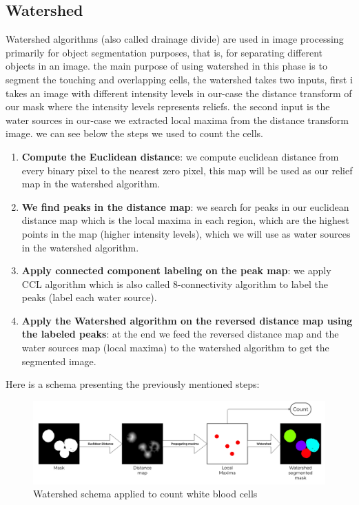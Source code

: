 \subsection{Watershed}
\hspace{\parindent}
Watershed algorithms (also called drainage divide) are used in image processing primarily for object segmentation purposes, that is, for separating different objects in an image. the main purpose of using watershed in this phase is to segment the touching and overlapping cells, the watershed takes two inputs, first i takes an image with different intensity levels in our-case the distance transform of our mask where the intensity levels represents reliefs. the second input is the water sources in our-case we extracted local maxima from the distance transform image. we can see below the steps we used to count the cells.

\begin{enumerate}
    \item \textbf{Compute the Euclidean distance}: we compute euclidean distance from every binary pixel to the nearest zero pixel, this map will be used as our relief map in the watershed algorithm.
    \item \textbf{We find peaks in the distance map}: we search for peaks in our euclidean distance map which is the local maxima in each region, which are the highest points in the map (higher intensity levels), which we will use as water sources in the watershed algorithm.
    \item \textbf{Apply connected component labeling on the peak map}: we apply CCL algorithm which is also called 8-connectivity algorithm to label the peaks (label each water source).
    \item \textbf{Apply the Watershed algorithm on the reversed distance map using the labeled peaks}: at the end we feed the reversed distance map and the water sources map (local maxima) to the watershed algorithm to get the segmented image. 
\end{enumerate}

Here is a schema presenting the previously mentioned steps:

\begin{figure}[H]
\centering
  \vspace{-0.1in}
    \centerline{\includegraphics[width = 7in]{../images/watershed.png}}
    \caption{Watershed schema applied to count white blood cells}
\end{figure}

